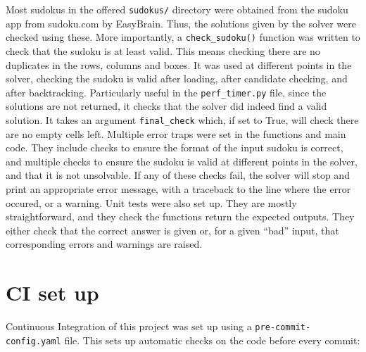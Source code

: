 \documentclass[12pt]{report} %
\begin{document}
Most sudokus in the offered \texttt{sudokus/} directory were obtained from the sudoku app from sudoku.com\cite{sudoku_com} by EasyBrain. Thus, the solutions given by the solver were checked using these. More importantly, a \texttt{check\_sudoku()} function was written to check that the sudoku is at least valid. This means checking there are no duplicates in the rows, columns and boxes. It was used at different points in the solver, checking the sudoku is valid after loading, after candidate checking, and after backtracking. Particularly useful in the \texttt{perf\_timer.py} file, since the solutions are not returned, it checks that the solver did indeed find a valid solution. It takes an argument \texttt{final\_check} which, if set to True, will check there are no empty cells left.
Multiple error traps were set in the functions and main code. They include checks to ensure the format of the input sudoku is correct, and multiple checks to ensure the sudoku is valid at different points in the solver, and that it is not unsolvable. If any of these checks fail, the solver will stop and print an appropriate error message, with a traceback to the line where the error occured, or a warning.
Unit tests were also set up. They are mostly straightforward, and they check the functions return the expected outputs. They either check that the correct answer is given or, for a given ``bad'' input, that corresponding errors and warnings are raised.

\section{CI set up}

Continuous Integration of this project was set up using a \texttt{pre-commit-config.yaml} file. This sets up automatic checks on the code before every commit:
\end{document}
